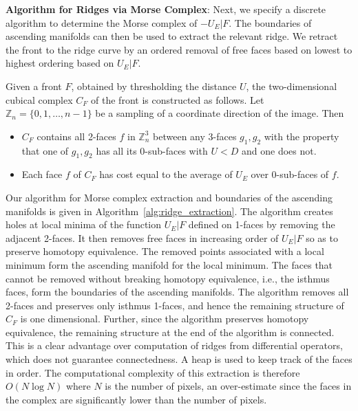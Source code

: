 \documentclass[10pt,journal,compsoc]{IEEEtran}
\newcommand{\Z}{\mathbb{Z}}
\begin{document}
{\bf Algorithm for Ridges via Morse Complex}: Next, we specify a
discrete algorithm to determine the Morse complex of $-U_E|F$. The
boundaries of ascending manifolds can then be used to extract the
relevant ridge. We retract the front to the ridge curve by an ordered
removal of free faces based on lowest to highest ordering based on
$U_E|F$.

Given a front $F$, obtained by thresholding the distance $U$, the
two-dimensional cubical complex $C_F$ of the front
is constructed as follows. Let $\Z_n = \{ 0, 1, \ldots, n-1 \}$ be a
sampling of a coordinate direction of the image. Then
\begin{itemize}
\item $C_F$ contains all 2-faces $f$ in $\Z_n^3$ between any 3-faces
  $g_1, g_2$ with the property that one of $g_1,g_2$ has all its
  0-sub-faces with $U < D$ and one does not.
\item Each face $f$ of $C_F$ has cost equal to the average of $U_E$
  over 0-sub-faces of $f$.
\end{itemize}

Our algorithm for Morse complex extraction and boundaries of the
ascending manifolds is given in
Algorithm~\ref{alg:ridge_extraction}. The algorithm creates holes at
local minima of the function $U_E|F$ defined on 1-faces by removing
the adjacent 2-faces. It then removes free faces in increasing order
of $U_E|F$ so as to preserve homotopy equivalence. The removed points
associated with a local minimum form the ascending manifold for the
local minimum. The faces that cannot be removed without breaking
homotopy equivalence, i.e., the isthmus faces, form the boundaries of
the ascending manifolds. The algorithm removes all 2-faces and
preserves only isthmus 1-faces, and hence the remaining structure of
$C_F$ is one dimensional. Further, since the algorithm preserves
homotopy equivalence, the remaining structure at the end of the
algorithm is connected. This is a clear advantage over computation of
ridges from differential operators, which does not guarantee
connectedness. A heap is used to keep track of the faces in order. The
computational complexity of this extraction is therefore $O(N\log N)$
where $N$ is the number of pixels, an over-estimate since the faces in
the complex are significantly lower than the number of pixels.
\end{document}
